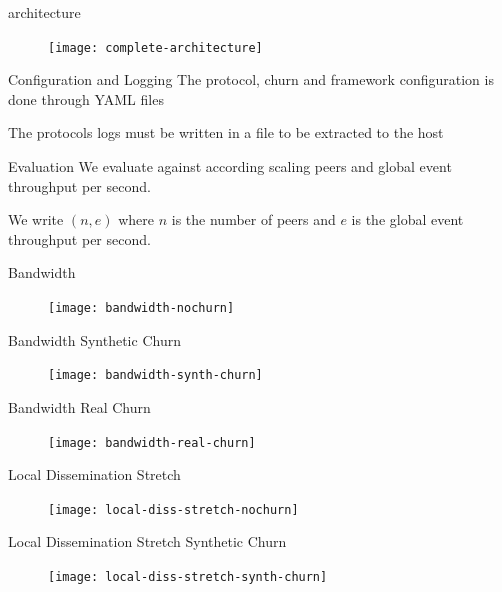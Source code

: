 \begin{frame}{\sys{} architecture}
	\begin{figure}
		\texttt{[image: complete-architecture]}
	\end{figure}
\end{frame}

\begin{frame}{\sys{} Configuration and Logging}
	The protocol, churn and framework configuration is done through \textsc{YAML} files
	
	The protocols logs must be written in a file to be extracted to the host
\end{frame}

\subtitle[Evaluation]{Evaluation}

\begin{frame}{Evaluation}
    We evaluate \epto{} against \jgroups{} according scaling peers and global event throughput per second.
    
    We write $(n,e)$ where $n$ is the number of peers and $e$ is the global event throughput per second.
\end{frame}

\begin{frame}{Bandwidth}
	\begin{figure}
		\texttt{[image: bandwidth-nochurn]}
	\end{figure}
\end{frame}

\begin{frame}{Bandwidth Synthetic Churn}
	\begin{figure}
		\texttt{[image: bandwidth-synth-churn]}
	\end{figure}
\end{frame}

\begin{frame}{Bandwidth Real Churn}
	\begin{figure}
		\texttt{[image: bandwidth-real-churn]}
	\end{figure}
\end{frame}

\begin{frame}{Local Dissemination Stretch}
	\begin{figure}
		\texttt{[image: local-diss-stretch-nochurn]}
	\end{figure}
\end{frame}

\begin{frame}{Local Dissemination Stretch Synthetic Churn}
	\begin{figure}
		\texttt{[image: local-diss-stretch-synth-churn]}
	\end{figure}
\end{frame}

